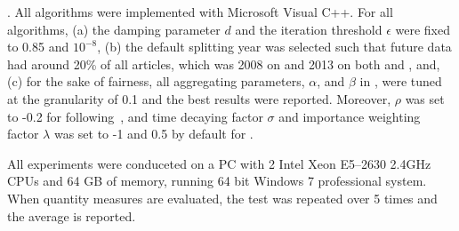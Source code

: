 .
All algorithms were implemented with Microsoft Visual C++.
For all algorithms, (a) the damping parameter $d$ and the iteration threshold $\epsilon$ were fixed to 0.85 and $10^{-8}$,
(b) the default splitting year was selected such that future data had around 20\% of all articles, which was 2008 on \aan and 2013 on both \aminer and \magdata, and,
(c) for the sake of fairness, all aggregating parameters, \eg $\alpha$, and $\beta$ in \ensemblerank, were tuned at the granularity of 0.1 and the best results were reported.
%
Moreover, $\rho$ was set to -0.2 for \futurerank following~\cite{sayyadi09}, and time decaying factor $\sigma$ and importance weighting factor $\lambda$ was set to -1 and 0.5  by default for \ensemblerank.

All experiments were conduceted on a PC with 2 Intel Xeon E5--2630 2.4GHz CPUs and 64 GB of memory, running 64 bit Windows 7 professional system. %
When quantity measures are evaluated, the test was repeated over 5 times and the average is reported.




